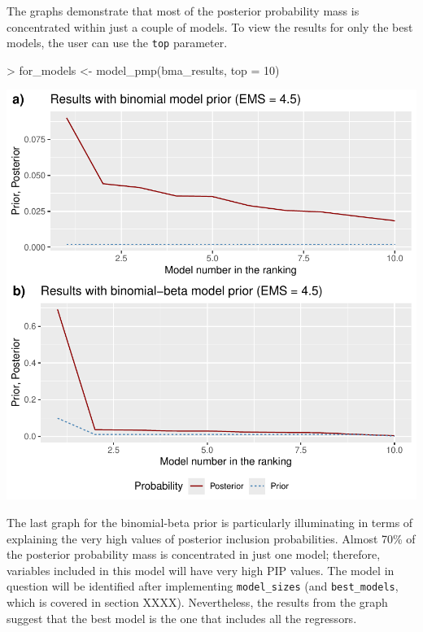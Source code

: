 \documentclass[a4paper]{article}
\begin{document}
The graphs demonstrate that most of the posterior probability mass is concentrated within just a couple of models.
To view the results for only the best models, the user can use the \verb+top+ parameter.
\begin{Schunk}
\begin{Sinput}
> for_models <- model_pmp(bma_results, top = 10)
\end{Sinput}
\end{Schunk}
\includegraphics{bdsm_vignette-015}

The last graph for the binomial-beta prior is particularly illuminating in terms of explaining the very high values of posterior inclusion probabilities.
Almost 70\% of the posterior probability mass is concentrated in just one model; therefore, variables included in this model will have very high PIP values.
The model in question will be identified after implementing \verb+model_sizes+ (and \verb+best_models+, which is covered in section XXXX).
Nevertheless, the results from the graph suggest that the best model is the one that includes all the regressors.
\end{document}
